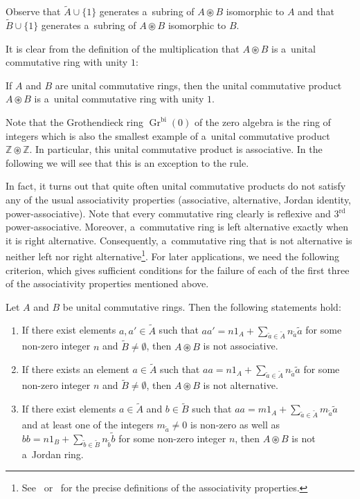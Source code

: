 \documentclass{jonasart}
\DeclareMathOperator{\bi}{bi}
\DeclareMathOperator{\K}{Gr}
\newcommand{\zbb}{\mathbb{Z}}
\begin{document}
	Observe that $\widetilde{A}\cup\{1\}$ generates a~subring of $A\circledast
	B$ isomorphic to $A$ and that $\widetilde{B}\cup\{1\}$ generates a~subring of $A\circledast B$ isomorphic to $B$.

	It is clear from the definition of the multiplication that $A\circledast B$ is a~unital commutative ring with unity $1$:
	\begin{proposition}
		If $A$ and $B$ are unital commutative rings, then the unital commutative product $A\circledast B$ is a~unital commutative ring with unity $1$.
	\end{proposition}
	Note that the Grothendieck ring $\K^{\bi}(0)$ of the zero algebra is the ring of integers which is also the smallest example of a~unital commutative product $\zbb\circledast\zbb$. In particular, this unital commutative product is associative. In the following we will see that this is an exception to the rule.

	In fact, it turns out that quite often unital commutative products do not satisfy any of the usual associativity properties (associative, alternative, Jordan identity, power-associative). Note that every commutative ring clearly is reflexive and
	3$^\textrm{rd}$ power\--as\-so\-cia\-tive. Moreover, a~commutative ring is left alternative exactly when it is right alternative. Consequently, a~commutative ring that is not alternative is neither left nor right alternative\footnote{See~\cite{BMS} or~\cite{S}
	for the precise definitions of the associativity properties.}. For later applications, we need the following criterion, which gives sufficient conditions for the failure of each of the first three of the associativity properties mentioned above.

	\begin{lemma}\label{criterion}
		Let $A$ and $B$ be unital commutative rings. Then the following statements hold:
		\begin{enumerate}
			\item[\textrm{(a)}] If there exist elements $a,a'\in\widetilde{A}$ such that $aa'
			=n1_A +\sum_{\tilde{a}\in\widetilde{A}}n_{\tilde{a}}\tilde{a}$
			for some non-zero integer $n$ and $\widetilde{B}\ne\emptyset$, then $A\circledast B$ is not associative.
			\item[\textrm{(b)}] If there exists an element $a\in\widetilde{A}$ such that $aa=n1_A
			+\sum_{\tilde{a}\in\widetilde{A}}n_{\tilde{a}}\tilde{a}$ for some non-zero integer $n$ and $\widetilde{B}\ne\emptyset$, then
			$A\circledast B$ is not alternative.
			\item[\textrm{(c)}] If there exist elements $a\in\widetilde{A}$ and $b\in\widetilde{B}$
			such that $aa=m1_A +\sum_{\tilde{a}\in\widetilde{A}}
			m_{\tilde{a}}\tilde{a}$ and at least one of the integers $m_{\tilde{a}}
			\ne 0$ is non-zero as well as $bb=n1_B +\sum_{\tilde{b}\in
			\widetilde{B}}n_{\tilde{b}}\tilde{b}$ for some non-zero integer $n$, then $A\circledast B$ is not a~Jordan ring.
		\end{enumerate}
	\end{lemma}
\end{document}
